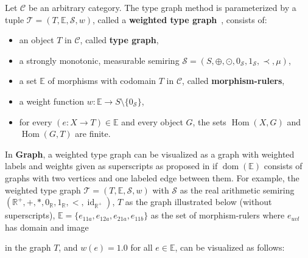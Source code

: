Let $\mathcal{C}$ be an arbitrary category. 
The type graph method is parameterized by a tuple \(\mathcal{T} = (T, \mathbb{E}, \mathcal{S}, w)\), called a \textbf{weighted type graph}~\cite{endrullis2024generalized_arxiv_v2}, consists of:
    \begin{itemize} 
        \item an object \(T\) in $\mathcal{C}$, called \textbf{type graph},
        \item a strongly monotonic, measurable semiring \(\mathcal{S}=(S, \oplus, \odot, 0_\mathcal{S}, 1_\mathcal{S}, \prec, \mu)\),
        \item a set \(\mathbb{E}\) of morphisms with codomain $T$ in $\mathcal{C}$, called \textbf{morphism-rulers}, 
        \item a weight function \(w : \mathbb{E} \to S \setminus \{0_\mathcal{S}\}\),
        \item for every \( (e :X \to T) \in \mathbb{E}\) and every object \(G\), the sets \(\operatorname{Hom}(X, G)\) and \(\operatorname{Hom}(G, T)\) are finite.
    \end{itemize}

\begin{example}
    \label{example:weighted_type_graph}
     In \textbf{Graph}, a weighted type graph can be visualized as a graph with weighted labels and weights given as superscripts as proposed in \cite{bruggink2015proving} if $\operatorname{dom}(\mathbb{E})$ consists of graphs with two vertices and one labeled edge between them. For example, the weighted type graph $\mathcal{T} = (T, \mathbb{E}, \mathcal{S}, w)$ with $\mathcal{S}$ as the real arithmetic semiring $(\mathbb{R}^+, +, *, 0_\mathbb{R}, 1_\mathbb{R}, <, \operatorname{id}_{\mathbb{R}^+})$,
     $T$ as the graph illustrated below (without superscripts), $\mathbb{E}=\{e_{11a},e_{12a},e_{21a},e_{11b}\}$ as the set of morphism-rulers where 
     $e_{uvl}$ has domain 
      and image 
     in the graph $T$,
    and $w(e) = 1.0$ for all $e \in \mathbb{E}$, can be visualized as follows:
    \begin{center}
    \end{center}
\end{example}
 
